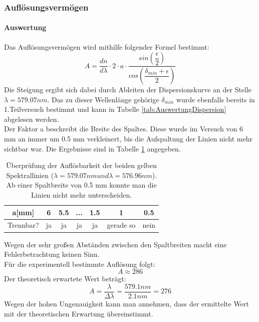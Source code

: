 \documentclass[12pt,a4paper]{article}
\begin{document}
\subsubsection{Auflösungsvermögen}
\paragraph{Auswertung}
Das Auflösungsvermögen wird mithilfe folgender Formel bestimmt:
\begin{equation}
A = \dfrac{dn}{d\lambda}\cdot 2\cdot a\cdot\dfrac{sin\left(\dfrac{\epsilon}{2}\right)}{cos\left(\dfrac{\delta_{min}+\epsilon}{2}\right)}
\end{equation}
Die Steigung ergibt sich dabei durch Ableiten der Dispersionskurve an der Stelle $\lambda = 579.07 nm$. Das zu dieser Wellenlänge gehörige $\delta_{min}$ wurde ebenfalls bereits in 1.Teilversuch bestimmt und kann in Tabelle \ref{tab:AuswertungDispersion} abgelesen werden. \\
Der Faktor a beschreibt die Breite des Spaltes. Diese wurde im Versuch von 6 mm an immer um 0.5 mm verkleinert, bis die Aufspaltung der Linien nicht mehr sichtbar war. Die Ergebnisse sind in Tabelle \ref{tab:Auflosung_Prisma} angegeben.
\begin{table}
\begin{tabular}{|c|c|c|c|c|c|c|}
\hline
a[mm] & 6 & 5.5 & ... & 1.5 & 1 & 0.5\\
\hline
Trennbar? & ja & ja & ja & ja & gerade so & nein\\
\hline
\end{tabular}
\caption{Überprüfung der Auflösbarkeit der beiden gelben Spektrallinien ($\lambda = 579.07nm und \lambda = 576.96nm$). Ab einer Spaltbreite von 0.5 mm konnte man die Linien nicht mehr unterscheiden.}
\label{tab:Auflosung_Prisma}
\end{table}
	Wegen der sehr großen Abständen zwischen den Spaltbreiten macht eine Fehlerbetrachtung keinen Sinn.\\
	Für die experimentell bestimmte Auflösung folgt:
	\begin{equation}
	A \approx 286
	\end{equation}
	Der theoretisch erwartete Wert beträgt:
	\begin{equation}
	A = \dfrac{\lambda}{\Delta \lambda} = \dfrac{579.1 nm}{2.1 nm} = 276
	\end{equation}
	Wegen der hohen Ungenauigkeit kann man annehmen, dass der ermittelte Wert mit der theoretischen Erwartung übereinstimmt.
\end{document}
